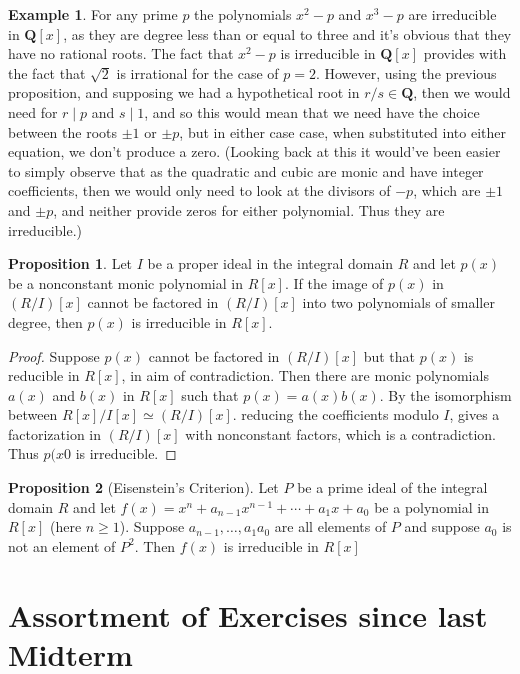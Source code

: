 \documentclass[9pt,reqno]{amsart}
\theoremstyle{definition}
\newtheorem{prop}{Proposition}[section]
\newtheorem{ex}{Example}[section]
\newcommand{\qq}{\mathbf Q}
\begin{document}
\begin{ex}
For any prime $p$ the polynomials $x^2 - p$ and $x^3 - p$ are irreducible in $\qq [x]$, as they are degree less than or equal to three and it's obvious that they have no rational roots. The fact that $x^2 - p$ is irreducible in $\qq[x]$ provides with the fact that $\sqrt{2}$ is irrational for the case of $p=2$. However, using the previous proposition, and supposing we had a hypothetical root in $r/s \in \qq$, then we would need for $r \mid p$ and $s \mid 1$, and so this would mean that we need have the choice between the roots $\pm 1$ or $\pm p$, but in either case case, when substituted into either equation, we don't produce a zero. (Looking back at this it would've been easier to simply observe that as the quadratic and cubic are monic and have integer coefficients, then we would only need to look at the divisors of $-p$, which are $\pm 1$ and $\pm p$, and neither provide zeros for either polynomial. Thus they are irreducible.)
\end{ex}
\begin{prop}
Let $I$ be a proper ideal in the integral domain $R$ and let $p(x)$ be a nonconstant monic polynomial in $R[x]$. If the image of $p(x)$ in $(R/I)[x]$ cannot be factored in $(R/I)[x]$ into two polynomials of smaller degree, then $p(x)$ is irreducible in $R[x]$. 	
\end{prop}
\begin{proof}
	Suppose $p(x)$ cannot be factored in $(R/I)[x]$ but that $p(x)$ is reducible in $R[x]$, in aim of contradiction. Then there are monic polynomials $a(x)$ and $b(x)$ in $R[x]$ such that $p(x) = a(x) b(x)$. By the isomorphism between $R[x]/I[x] \simeq (R/I)[x]$. reducing the coefficients modulo $I$, gives a factorization in $(R/I) [x]$ with nonconstant factors, which is a contradiction. Thus $p(x0$ is irreducible. 
\end{proof}
\begin{prop}[Eisenstein's Criterion] Let $P$ be a prime ideal of the integral domain $R$ and let $f(x) = x^n+ a_{n-1}x^{n-1} + \cdots + a_1 x + a_0$ be a polynomial in $R[x]$ (here $n \geq 1$). Suppose $a_{n-1}, \ldots, a_1 a_0$ are all elements of $P$ and suppose $a_0$ is not an element of $P^2$. Then $f(x)$ is irreducible in $R[x]$
\end{prop}
\section{Assortment of Exercises since last Midterm}
\end{document}
